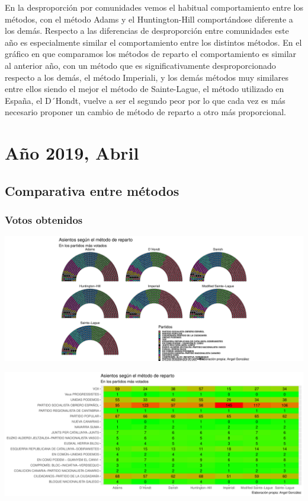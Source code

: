 \documentclass[12pt,a4paper,]{book}
\numberwithin{dummy}{section}
\theoremstyle{ocrenumbox}
\theoremstyle{blacknumex}
\theoremstyle{blacknumbox}
\theoremstyle{ocrenum}
\theoremstyle{ocrenum}
\begin{document}
En la desproporción por comunidades vemos el habitual comportamiento
entre los métodos, con el método Adams y el Huntington-Hill
comportándose diferente a los demás. Respecto a las diferencias de
desproporción entre comunidades este año es especialmente similar el
comportamiento entre los distintos métodos. En el gráfico en que
comparamos los métodos de reparto el comportamiento es similar al
anterior año, con un método que es significativamente desproporcionado
respecto a los demás, el método Imperiali, y los demás métodos muy
similares entre ellos siendo el mejor el método de Sainte-Lague, el
método utilizado en España, el D´Hondt, vuelve a ser el segundo peor por
lo que cada vez es más necesario proponer un cambio de método de reparto
a otro más proporcional.

\hypertarget{auxf1o-2019-abril}{%
\section{Año 2019, Abril}\label{auxf1o-2019-abril}}

\hypertarget{comparativa-entre-muxe9todos-13}{%
\subsection{Comparativa entre
métodos}\label{comparativa-entre-muxe9todos-13}}

\hypertarget{votos-obtenidos-13}{%
\subsubsection{Votos obtenidos}\label{votos-obtenidos-13}}

\begin{center}\includegraphics[width=0.95\linewidth]{figurasR/unnamed-chunk-179-1} \end{center}

\begin{center}\includegraphics[width=0.95\linewidth]{figurasR/unnamed-chunk-179-2} \end{center}
\end{document}
